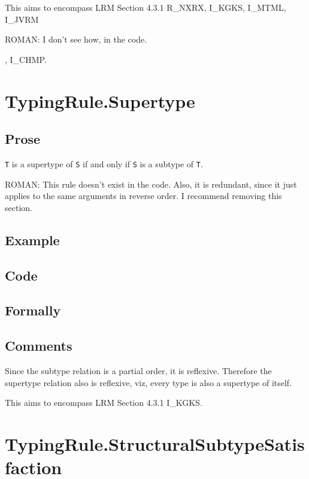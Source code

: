 \documentclass{book}
\begin{document}
  This aims to encompass LRM Section 4.3.1 R\_NXRX, I\_KGKS, I\_MTML, I\_JVRM 
\begin{emptytodo}  
ROMAN: I don't see how, in the code.
\end{emptytodo}
, I\_CHMP.

\section{TypingRule.Supertype}

  \subsection{Prose}
  \texttt{T} is a supertype of \texttt{S} if and only if \texttt{S} is a subtype of \texttt{T}.
  
\begin{emptytodo}
ROMAN: This rule doesn't exist in the code. Also, it is redundant, since it just applies to the same arguments in reverse order. I recommend removing this section.
\end{emptytodo}

  \subsection{Example}

  \subsection{Code}

\begin{emptyformal}
  \subsection{Formally}
\end{emptyformal}

\subsection{Comments}
  Since the subtype relation is a partial order, it is reflexive. Therefore the
  supertype relation also is reflexive, viz, every type is also a supertype of
  itself.

  This aims to encompass LRM Section 4.3.1 I\_KGKS.

\section{TypingRule.StructuralSubtypeSatisfaction}
\end{document}
